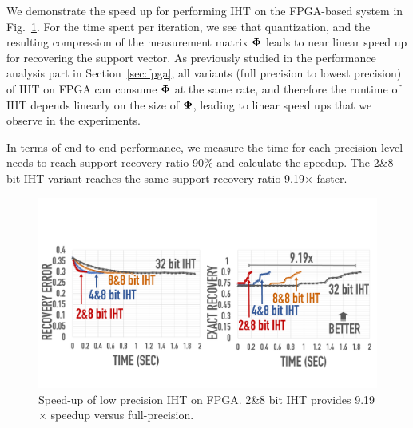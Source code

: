 \documentclass{article}
\begin{document}
{We demonstrate the speed up for performing IHT on the FPGA-based system in Fig.~\ref{fig:fpga_time}. For the time spent per iteration, we see that quantization, and the resulting compression of the measurement matrix ${\bf \Phi}$ leads to near linear speed up for recovering the support vector. As previously studied in the performance analysis part in Section~\ref{sec:fpga}, all variants (full precision to lowest precision) of IHT on FPGA can consume ${\bf \Phi}$ at the same rate, and therefore the runtime of IHT depends linearly on the size of ${\bf \Phi}$, leading to linear speed ups that we observe in the experiments.

In terms of end-to-end performance, we measure the time for
each precision level needs to reach support recovery
ratio 90\% and calculate the speedup. The 2\&8-bit IHT variant reaches the same support recovery
ratio 9.19$\times$ faster.




\begin{figure}[t!]
\centering
\includegraphics[width=1.02\columnwidth, angle=0]{figs/fpga.pdf}
\caption{Speed-up of low precision IHT on FPGA. 2\&8 bit IHT provides 9.19$\times$ speedup versus full-precision.}
\label{fig:fpga_time}
\end{figure}
\vspace{-1em}
}
\end{document}

